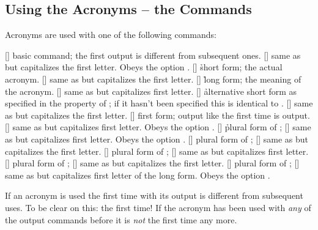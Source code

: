 \documentclass{acro-manual}
\begin{document}
\subsection{Using the Acronyms -- the Commands}\label{sec:using-acronyms-comm}
Acronyms are used with one of the following commands:
\begin{commands}
  [\sarg{}]
    basic command; the first output is different from subsequent ones.
  [\sarg{}]
    same as  but capitalizes the first letter.  Obeys the option
    .
  [\sarg{}]
    \h{s}hort form; the actual acronym.
  [\sarg{}]
    same as  but capitalizes the first letter.
  [\sarg{}]
    \h{l}ong form; the meaning of the acronym.
  [\sarg{}] 
    same as  but capitalizes first letter.
  [\sarg{}]
    \h{a}lternative short form as specified in the  property of
    ; if it hasn't been specified this is identical to
    .
  [\sarg{}]
    same as  but capitalizes the first letter.
  [\sarg{}]
    first form; output like the first time  is output.
  [\sarg{}]
    same as  but capitalizes first letter.  Obeys the option
    .
  [\sarg{}]
    \h{p}lural form of ;
  [\sarg{}]
    same as  but capitalizes first letter.  Obeys the option
    .
  [\sarg{}]
    plural form of ;
  [\sarg{}]
    same as  but capitalizes the first letter.
  [\sarg{}]
    plural form of ;
  [\sarg{}]
    same as  but capitalizes first letter.
  [\sarg{}]
    plural form of ;
  [\sarg{}]
    same as  but capitalizes the first letter.
  [\sarg{}]
    plural form of ;
  [\sarg{}]
    same as  but capitalizes first letter of the long form.  Obeys
    the option .
\end{commands}
If an acronym is used the first time with  its output is different from
subsequent uses.  To be clear on this: the first time!  If the acronym has
been used with \emph{any} of the output commands before it is \emph{not} the
first time any more.
\end{document}
